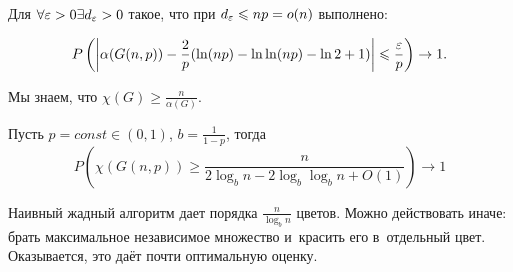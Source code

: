 \documentclass{article}
\begin{document}
\begin{theorem}[Фриз]
	Для $\forall \varepsilon > 0 \exists d_\varepsilon > 0$ такое, что при $d_\varepsilon \leqslant np = o(n)$ выполнено:

	$$ P\left(\left|\alpha(G(n,p)) - \frac{2}{p}(\ln(np) - \ln \ln (np) - \ln 2 + 1)\right|
	\leqslant \frac{\varepsilon}{p}\right) \rightarrow 1.$$
\end{theorem}

Мы знаем, что $\chi(G) \ge \frac{n}{\alpha(G)}$.

\begin{corollary}
	Пусть $p = const \in (0, 1)$, $b = \frac{1}{1 - p}$, тогда
	$$ P\left(\chi(G(n, p)) \ge \frac{n}{2\log_b n - 2\log_b \log_b n + O(1)}\right) \rightarrow 1 $$
\end{corollary}

Наивный жадный алгоритм дает порядка $\frac{n}{\log_b n}$ цветов. Можно действовать иначе: брать
максимальное независимое множество и~красить его в~отдельный цвет. Оказывается, это даёт почти
оптимальную оценку.
\end{document}
